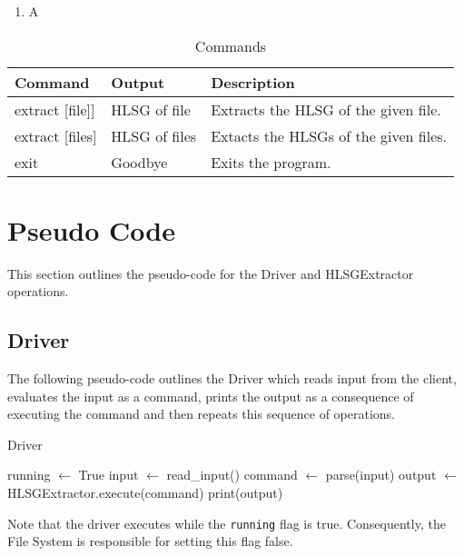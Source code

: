 \documentclass{sig-alternate}
\begin{document}
\begin{enumerate}[noitemsep]
	\item A
\end{enumerate}

\begin{table}
	\begin{tabular}{| l | l | p{4.5cm} |}
		\hline
		\textbf{Command} & \textbf{Output} & \textbf{Description} \\\hline
		extract [file]] & HLSG of file & Extracts the HLSG of the given file. \\\hline
		extract [files] & HLSG of files & Extacts the HLSGs of the given files. \\\hline
		exit & Goodbye & Exits the program. \\\hline
	\end{tabular}
	\label{tab:commands}
	\caption{Commands}
\end{table}


\section{Pseudo Code} %
\label{sec:Pseudo Code}

This section outlines the pseudo-code for the Driver and HLSGExtractor
operations. 

	\subsection{Driver} %
	\label{sub:Driver}

	The following pseudo-code outlines the Driver which reads input from the
	client, evaluates the input as a command, prints the output as a
	consequence of executing the command and then repeats this sequence of
	operations.
	\begin{algorithm}[ht!]
		\caption{Driver}
		\begin{algorithmic}
				\State running $\gets$ True
					\State input $\gets$ read\_input()
					\State command $\gets$ parse(input)
					\State output $\gets$ HLSGExtractor.execute(command)
					\State print(output)
				\EndWhile
			\EndProcedure
		\end{algorithmic}
	\end{algorithm}

	Note that the driver executes while the \lstinline$running$ flag is true.
	Consequently, the File System is responsible for setting this flag false.


\end{document}
